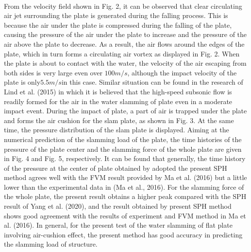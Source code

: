 \documentclass[UTF8]{ctexart}
\begin{document}
\paragraph{\quad}From the velocity field shown in Fig. 2, it can be observed that clear 
                circulating air jet surrounding the plate is generated during the falling process. 
                This is because the air under the plate is compressed during the falling of the 
                plate, causing the pressure of the air under the plate to increase and the pressure 
                of the air above the plate to decrease. As a result, the air flows around the edges 
                of the plate, which in turn forms a circulating air vortex as displayed in Fig. 2. 
                When the plate is about to contact with the water, the velocity of the air escaping 
                from both sides is very large even over $100 m/s$, although the impact velocity of the 
                plate is only$ 5.5 m/s $in this case. Similar situation can be found in the research of 
                Lind et al. (2015) in which it is believed that the high-speed subsonic flow is readily 
                formed for the air in the water slamming of plate even in a moderate impact event. 
                During the impact of plate, a part of air is trapped under the plate and forms the air 
                cushion for the slam plate, as shown in Fig. 3. At the same time, the pressure distribution 
                of the slam plate is displayed. Aiming at the numerical prediction of the slamming load 
                of the plate, the time histories of the pressure of the plate center and the slamming force 
                of the whole plate are given in Fig. 4 and Fig. 5, respectively. It can be found that 
                generally, the time history of the pressure at the center of plate obtained by adopted 
                the present SPH method agrees well with the FVM result provided by Ma et al. (2016) but a 
                little lower than the experimental data in (Ma et al., 2016). For the slamming force of 
                the whole plate, the present result obtains a higher peak compared with the SPH result of 
                Yang et al. (2020), and the result obtained by present SPH method shows good agreement 
                with the results of experiment and FVM method in Ma et al. (2016). In general, for the 
                present test of the water slamming of flat plate involving air-cushion effect, the present 
                method has good accuracy in predicting the slamming load of structure.
\end{document}
